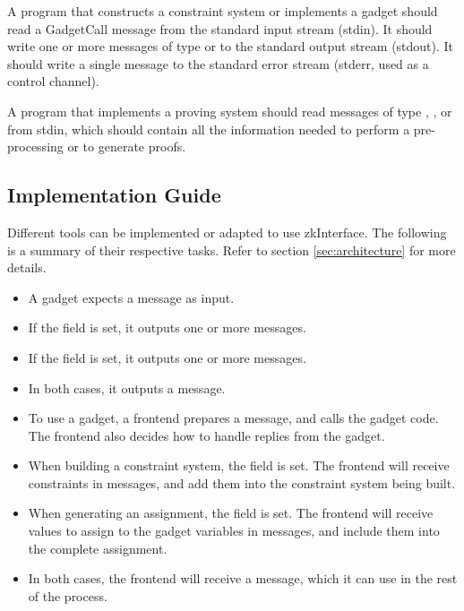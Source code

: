 A program that constructs a constraint system or implements a gadget should read a GadgetCall message from the standard input stream (stdin).
It should write one or more messages of type
 or 
to the standard output stream (stdout).
It should write a single  message to the standard error stream
(stderr, used as a control channel).

A program that implements a proving system should read messages of type
, , or 
from stdin, which should contain all the information needed to perform a pre-processing or to generate proofs.


\subsection{Implementation Guide}

Different tools can be implemented or adapted to use zkInterface. The following is a summary of their respective tasks. Refer to section \ref{sec:architecture} for more details.


\begin{itemize}
    \item A gadget expects a  message as input.

    \item If the field  is set, it outputs one or more  messages.

    \item If the field  is set, it outputs one or more  messages.

    \item In both cases, it outputs a  message.
\end{itemize}


\begin{itemize}
    \item To use a gadget, a frontend prepares a  message, and calls the gadget code. The frontend also decides how to handle replies from the gadget.

    \item When building a constraint system, the field  is set. The frontend will receive constraints in  messages, and add them into the constraint system being built.

    \item When generating an assignment, the field  is set. The frontend will receive values to assign to the gadget variables in  messages, and include them into the complete assignment.

    \item In both cases, the frontend will receive a  message, which it can use in the rest of the process.
\end{itemize}


